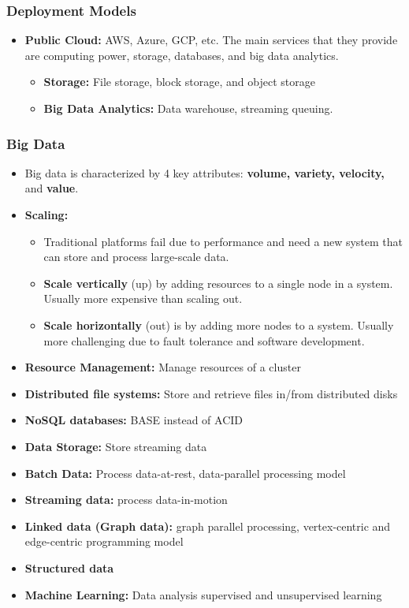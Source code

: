 \documentclass[12pt]{article}
\begin{document}
\subsubsection{Deployment Models}
\begin{itemize}
    \item \textbf{Public Cloud:} AWS, Azure, GCP, etc. The main services that they provide are computing power, storage, databases, and big data analytics.
    \begin{itemize}
        \item \textbf{Storage:} File storage, block storage, and object storage
        \item \textbf{Big Data Analytics:} Data warehouse, streaming queuing.
    \end{itemize}
\end{itemize}

\subsubsection{Big Data}
\begin{itemize}
    \item Big data is characterized by 4 key attributes: \textbf{volume, variety, velocity,} and \textbf{value}.
    \item \textbf{Scaling:}
    \begin{itemize}
        \item Traditional platforms fail due to performance and need a new system that can store and process large-scale data.
        \item \textbf{Scale vertically} (up) by adding resources to a single node in a system. Usually more expensive than scaling out.
        \item \textbf{Scale horizontally} (out) is by adding more nodes to a system. Usually more challenging due to fault tolerance and software development.
    \end{itemize}
    \item \textbf{Resource Management:} Manage resources of a cluster
    \item \textbf{Distributed file systems:} Store and retrieve files in/from distributed disks
    \item \textbf{NoSQL databases:} BASE instead of ACID
    \item \textbf{Data Storage:} Store streaming data
    \item \textbf{Batch Data:} Process data-at-rest, data-parallel processing model
    \item \textbf{Streaming data:} process data-in-motion
    \item \textbf{Linked data (Graph data):} graph parallel processing, vertex-centric and edge-centric programming model
    \item \textbf{Structured data}
    \item \textbf{Machine Learning:} Data analysis supervised and unsupervised learning
\end{itemize}
\end{document}
